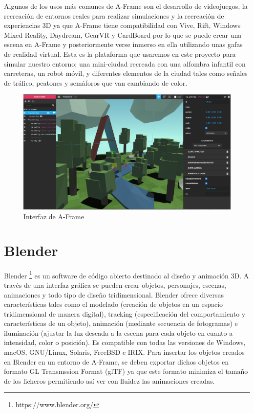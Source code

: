 \documentclass{report}
\begin{document}
Algunos de los usos más comunes de A-Frame son el desarrollo de videojuegos, la recreación de entornos reales para realizar simulaciones y la  recreación de experiencias 3D ya que A-Frame tiene compatibilidad con Vive, Rift, Windows Mixed Reality, Daydream, GearVR y CardBoard por lo que se puede crear una escena en A-Frame y posteriormente verse inmerso en ella utilizando unas gafas de realidad virtual. Esta es la plataforma que usaremos en este proyecto para simular nuestro entorno; una mini-ciudad recreada con una alfombra infantil con carreteras, un robot móvil, y diferentes elementos de la ciudad tales como señales de tráfico, peatones y semáforos que van cambiando de color.

\renewcommand{\figurename}{Figura}		
\begin{figure}[h]
	\centering
	 \includegraphics[scale=0.25]{images/a-frame.png}
	 \caption{Interfaz de A-Frame}
\end{figure}

\newpage
\section{Blender}
Blender \footnote{https://www.blender.org/} es un software de código abierto destinado al diseño y animación 3D. A través de una interfaz gráfica se pueden crear objetos, personajes, escenas, animaciones y todo tipo de diseño tridimensional. Blender ofrece diversas características tales como el modelado (creación de objetos en un espacio tridimensional de manera digital), tracking (especificación del comportamiento y características de un objeto), animación (mediante secuencia de fotogramas) e iluminación (ajustar la luz deseada a la escena para cada objeto en cuanto a intensidad, color o posición). Es compatible con todas las versiones de Windows, macOS, GNU/Linux, Solaris, FreeBSD e IRIX. Para insertar los objetos creados en Blender en un entorno de A-Frame, se deben exportar dichos objetos en formato GL Transmssion Format (glTF) ya que este formato minimiza el tamaño de los ficheros permitiendo así ver con fluidez las animaciones creadas.
\\
\end{document}

